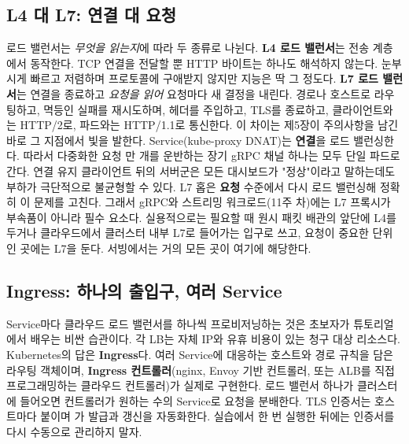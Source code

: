 \subsection*{L4 대 L7: 연결 대 요청}

로드 밸런서는 \textit{무엇을 읽는지}에 따라 두 종류로 나뉜다. \textbf{L4 로드 밸런서}는 전송 계층에서 동작한다. TCP 연결을 전달할 뿐 HTTP 바이트는 하나도 해석하지 않는다. 눈부시게 빠르고 저렴하며 프로토콜에 구애받지 않지만 지능은 딱 그 정도다. \textbf{L7 로드 밸런서}는 연결을 종료하고 \textit{요청을 읽어} 요청마다 새 결정을 내린다. 경로나 호스트로 라우팅하고, 멱등인 실패를 재시도하며, 헤더를 주입하고, TLS를 종료하고, 클라이언트와는 HTTP/2로, 파드와는 HTTP/1.1로 통신한다. 이 차이는 제5장이 주의사항을 남긴 바로 그 지점에서 빛을 발한다. Service(kube-proxy DNAT)는 \textbf{연결}을 로드 밸런싱한다. 따라서 다중화한 요청 만 개를 운반하는 장기 gRPC 채널 하나는 모두 단일 파드로 간다. 연결 유지 클라이언트 뒤의 서버군은 모든 대시보드가 "정상"이라고 말하는데도 부하가 극단적으로 불균형할 수 있다. L7 홉은 \textbf{요청} 수준에서 다시 로드 밸런싱해 정확히 이 문제를 고친다. 그래서 gRPC와 스트리밍 워크로드(11주 차)에는 L7 프록시가 부속품이 아니라 필수 요소다. 실용적으로는 필요할 때 원시 패킷 배관의 앞단에 L4를 두거나 클라우드에서 클러스터 내부 L7로 들어가는 입구로 쓰고, 요청이 중요한 단위인 곳에는 L7을 둔다. 서빙에서는 거의 모든 곳이 여기에 해당한다.

\subsection*{Ingress: 하나의 출입구, 여러 Service}

Service마다 클라우드 로드 밸런서를 하나씩 프로비저닝하는 것은 초보자가 튜토리얼에서 배우는 비싼 습관이다. 각 LB는 자체 IP와 유휴 비용이 있는 청구 대상 리소스다. Kubernetes의 답은 \textbf{Ingress}다. 여러 Service에 대응하는 호스트와 경로 규칙을 담은 라우팅 객체이며, \textbf{Ingress 컨트롤러}(nginx, Envoy 기반 컨트롤러, 또는 ALB를 직접 프로그래밍하는 클라우드 컨트롤러)가 실제로 구현한다. 로드 밸런서 하나가 클러스터에 들어오면 컨트롤러가 원하는 수의 Service로 요청을 분배한다. TLS 인증서는 호스트마다 붙이며 가 발급과 갱신을 자동화한다. 실습에서 한 번 실행한 뒤에는 인증서를 다시 수동으로 관리하지 말자.

